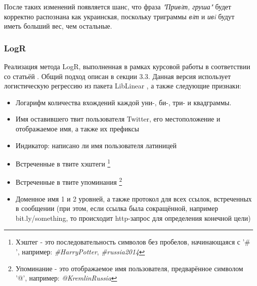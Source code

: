 \documentclass[a4paper, 14pt]{article}
\begin{document}
			После таких изменений появляется шанс, что фраза \textit{"Привiт, груша"} будет корректно распознана как украинская, поскольку триграммы
			\textit{вiт} и \textit{ивi} будут иметь больший вес, чем остальные.
			\subsubsection{LogR}
			Реализация метода LogR, выполненная в рамках курсовой работы в соответствии со статьёй \cite{ppm}. Общий подход описан в секции 3.3. Данная версия использует логистическую регрессию из пакета LibLinear \cite{fan}, а также следующие признаки:
			\begin{itemize}
				\item Логарифм количества вхождений каждой уни-, би-, три- и квадграммы.
				\item Имя оставившего твит пользователя Twitter, его местоположение и отображаемое имя, а также их префиксы
				\item Индикатор: написано ли имя пользователя латиницей
				\item Встреченные в твите хэштеги
					\footnote{Хэштег - это последовательность символов без пробелов, начинающаяся с '$\#$', например: \textit{\#HarryPotter}, \textit{\#russia2014}}
				\item Встреченные в твите упоминания
					\footnote{Упоминание - это отображаемое имя пользователя, предварённое символом '@', например: \textit{@KremlinRussia}}
				\item Доменное имя 1 и 2 уровней, а также протокол для всех ссылок, встреченных в сообщении (при этом, если ссылка была сокращённой,
				например bit.ly/something, то происходит http-запрос для определения конечной цели)
			\end{itemize}
\end{document}
